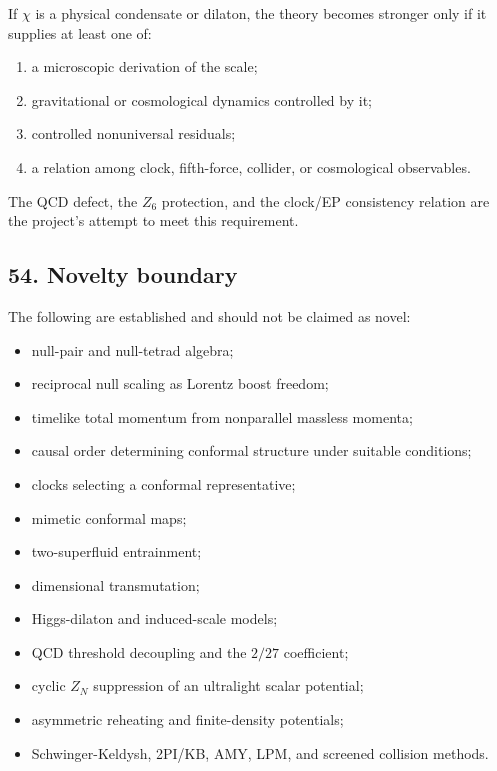 \documentclass[
]{article}
\providecommand{\tightlist}{%
  \setlength{\itemsep}{0pt}\setlength{\parskip}{0pt}}
\begin{document}
If \(\chi\) is a physical condensate or dilaton, the theory becomes
stronger only if it supplies at least one of:

\begin{enumerate}
\def\labelenumi{\arabic{enumi}.}
\tightlist
\item
  a microscopic derivation of the scale;
\item
  gravitational or cosmological dynamics controlled by it;
\item
  controlled nonuniversal residuals;
\item
  a relation among clock, fifth-force, collider, or cosmological
  observables.
\end{enumerate}

The QCD defect, the \(Z_6\) protection, and the clock/EP consistency
relation are the project's attempt to meet this requirement.

\subsection{54. Novelty boundary}\label{novelty-boundary}

The following are established and should not be claimed as novel:

\begin{itemize}
\tightlist
\item
  null-pair and null-tetrad algebra;
\item
  reciprocal null scaling as Lorentz boost freedom;
\item
  timelike total momentum from nonparallel massless momenta;
\item
  causal order determining conformal structure under suitable
  conditions;
\item
  clocks selecting a conformal representative;
\item
  mimetic conformal maps;
\item
  two-superfluid entrainment;
\item
  dimensional transmutation;
\item
  Higgs-dilaton and induced-scale models;
\item
  QCD threshold decoupling and the \(2/27\) coefficient;
\item
  cyclic \(Z_N\) suppression of an ultralight scalar potential;
\item
  asymmetric reheating and finite-density potentials;
\item
  Schwinger-Keldysh, 2PI/KB, AMY, LPM, and screened collision methods.
\end{itemize}
\end{document}
